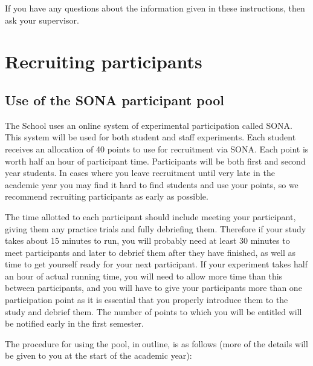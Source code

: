 \documentclass[
]{book}
\begin{document}
If you have any questions about the information given in these instructions, then ask your supervisor.

\chapter{Recruiting participants}\label{recruiting-participants}

\section{Use of the SONA participant pool}\label{use-of-the-sona-participant-pool}

The School uses an online system of experimental participation called SONA. This system will be used for both student and staff experiments. Each student receives an allocation of 40 points to use for recruitment via SONA. Each point is worth half an hour of participant time. Participants will be both first and second year students. In cases where you leave recruitment until very late in the academic year you may find it hard to find students and use your points, so we recommend recruiting participants as early as possible.

The time allotted to each participant should include meeting your participant, giving them any practice trials and fully debriefing them. Therefore if your study takes about 15 minutes to run, you will probably need at least 30 minutes to meet participants and later to debrief them after they have finished, as well as time to get yourself ready for your next participant. If your experiment takes half an hour of actual running time, you will need to allow more time than this between participants, and you will have to give your participants more than one participation point as it is essential that you properly introduce them to the study and debrief them. The number of points to which you will be entitled will be notified early in the first semester.

The procedure for using the pool, in outline, is as follows (more of the details will be given to you at the start of the academic year):
\end{document}
